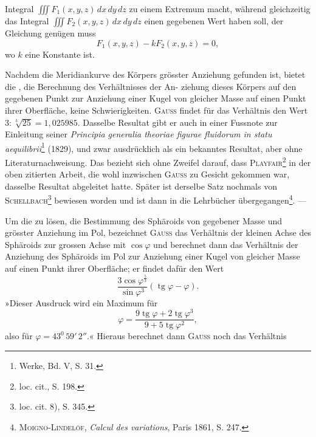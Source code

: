 Integral $\iiint F_1(x,y,z)\,dx\,dy\,dz$ zu einem Extremum macht, während gleichzeitig das Integral $\iiint F_2(x,y,z)\,dx\,dy\,dz$ einen gegebenen Wert haben soll,
der Gleichung genügen muss
\[
F_1(x,y,z)-kF_2(x,y,z)=0,
\]
wo $k$ eine Konstante ist.
\par\noindent\hspace*{\parindent}Nachdem die Meridiankurve des Körpers grösster Anziehung gefunden
ist, bietet die , die Berechnung des Verhältnisses der An-
\clearpage{}
\noindent ziehung dieses Körpers auf den gegebenen Punkt zur Anziehung einer Kugel
von gleicher Masse auf einen Punkt ihrer Oberfläche, keine Schwierigkeiten.
\textsc{Gauss} findet für das Verhältnis den Wert $3:\sqrt[3]{25}=1{,}025985$. Dasselbe Resultat gibt er auch in einer Fussnote zur Einleitung seiner \textit{Principia generalia
theoriae figurae fluidorum in statu aequilibrii}\footnote{Werke, Bd. V, S. 31.} (1829), und zwar ausdrücklich als
ein bekanntes Resultat, aber ohne Literaturnachweisung. Das bezieht sich
ohne Zweifel darauf, dass \textsc{Playfair}\footnote{loc. cit., S. 198.} in der oben zitierten Arbeit, die wohl
inzwischen \textsc{Gauss} zu Gesicht gekommen war, dasselbe Resultat abgeleitet
hatte. Später ist derselbe Satz nochmals von \textsc{Schellbach}\footnote{loc. cit. 8), S. 345.} bewiesen worden
und ist dann in die Lehrbücher übergegangen\footnote{\textsc{Moigno-Lindelöf}, \textit{Calcul des variations}, Paris 1861, S. 247.}. —
\par\noindent\hspace*{\parindent}Um die  zu lösen, die Bestimmung des Sphäroids von
gegebener Masse und grösster Anziehung im Pol, bezeichnet \textsc{Gauss} das Verhältnis der kleinen Achse des Sphäroids zur grossen Achse mit $\cos\varphi$ und berechnet dann das Verhältnis der Anziehung des Sphäroids im Pol zur Anziehung einer Kugel von gleicher Masse auf einen Punkt ihrer Oberfläche;
er findet dafür den Wert
\begin{equation*}\tag{7}
\frac{3\cos\varphi^{\frac53}}{\sin\varphi^3}(\operatorname{tg}\varphi-\varphi).
\end{equation*}
»Dieser Ausdruck wird ein Maximum für
\begin{equation*}\tag{8}
\varphi=\frac{9\operatorname{tg}\varphi+2\operatorname{tg}\varphi^3}{9+5\operatorname{tg}\varphi^2},
\end{equation*}
also für $\varphi=43^0\,59'\,2''$.« Hieraus berechnet dann \textsc{Gauss} noch das Verhältnis
